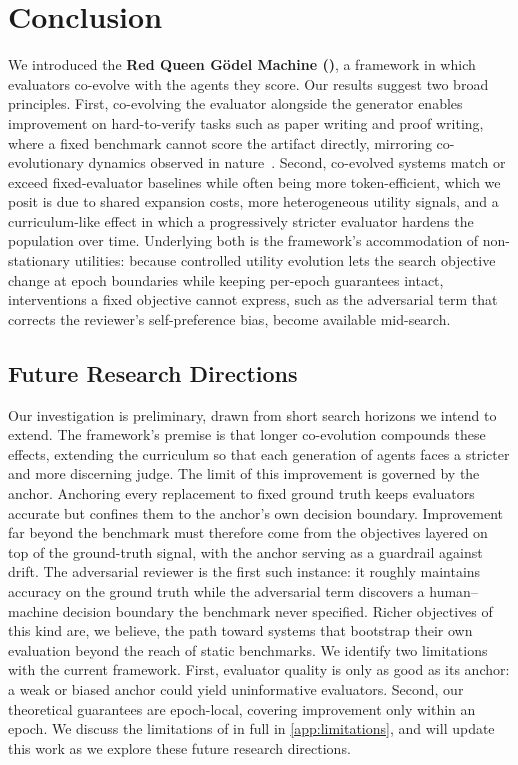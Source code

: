 \section{Conclusion}
\label{sec:conclusion}
We introduced the \textbf{Red Queen G\"odel Machine (\ourmethod)}, a framework in which evaluators co-evolve with the agents they score. Our results suggest two broad principles. First, co-evolving the evaluator alongside the generator enables improvement on hard-to-verify tasks such as paper writing and proof writing, where a fixed benchmark cannot score the artifact directly, mirroring co-evolutionary dynamics observed in nature~\citep{van1973new}. Second, co-evolved systems match or exceed fixed-evaluator baselines while often being more token-efficient, which we posit is due to shared expansion costs, more heterogeneous utility signals, and a curriculum-like effect in which a progressively stricter evaluator hardens the population over time. Underlying both is the framework's accommodation of non-stationary utilities: because controlled utility evolution lets the search objective change at epoch boundaries while keeping per-epoch guarantees intact, interventions a fixed objective cannot express, such as the adversarial term that corrects the reviewer's self-preference bias, become available mid-search.

\subsection{Future Research Directions}
\label{sec:future}
Our investigation is preliminary, drawn from short search horizons we intend to extend. The framework's premise is that longer co-evolution compounds these effects, extending the curriculum so that each generation of agents faces a stricter and more discerning judge. The limit of this improvement is governed by the anchor. Anchoring every replacement to fixed ground truth keeps evaluators accurate but confines them to the anchor's own decision boundary. Improvement far beyond the benchmark must therefore come from the objectives layered on top of the ground-truth signal, with the anchor serving as a guardrail against drift. The adversarial reviewer is the first such instance: it roughly maintains accuracy on the ground truth while the adversarial term discovers a human--machine decision boundary the benchmark never specified. Richer objectives of this kind are, we believe, the path toward systems that bootstrap their own evaluation beyond the reach of static benchmarks. We identify two limitations with the current framework. First, evaluator quality is only as good as its anchor: a weak or biased anchor could yield uninformative evaluators. Second, our theoretical guarantees are epoch-local, covering improvement only within an epoch. We discuss the limitations of \theourmethod in full in \cref{app:limitations}, and will update this work as we explore these future research directions.